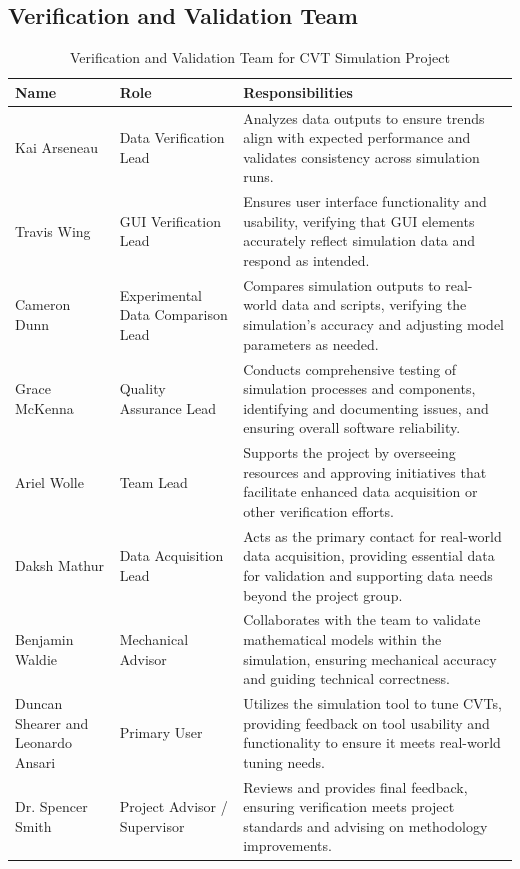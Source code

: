\documentclass[12pt, titlepage]{article}
\begin{document}
\subsection{Verification and Validation Team}

\begin{table}[h!]
  \centering
  \begin{tabular}{|p{3cm}|p{3cm}|p{10cm}|}
  \hline
  \textbf{Name} & \textbf{Role} & \textbf{Responsibilities} \\
  \hline
  Kai Arseneau & Data Verification Lead & Analyzes data outputs to ensure trends align with expected performance and validates consistency across simulation runs. \\
  \hline
  Travis Wing & GUI Verification Lead & Ensures user interface functionality and usability, verifying that GUI elements accurately reflect simulation data and respond as intended. \\
  \hline
  Cameron Dunn & Experimental Data Comparison Lead & Compares simulation outputs to real-world data and scripts, verifying the simulation's accuracy and adjusting model parameters as needed. \\
  \hline
  Grace McKenna & Quality Assurance Lead & Conducts comprehensive testing of simulation processes and components, identifying and documenting issues, and ensuring overall software reliability. \\
  \hline
  Ariel Wolle & Team Lead & Supports the project by overseeing resources and approving initiatives that facilitate enhanced data acquisition or other verification efforts. \\
  \hline
  Daksh Mathur &  Data Acquisition Lead & Acts as the primary contact for real-world data acquisition, providing essential data for validation and supporting data needs beyond the project group. \\
  \hline
  Benjamin Waldie & Mechanical Advisor & Collaborates with the team to validate mathematical models within the simulation, ensuring mechanical accuracy and guiding technical correctness. \\
  \hline
  Duncan Shearer and Leonardo Ansari & Primary User & Utilizes the simulation tool to tune CVTs, providing feedback on tool usability and functionality to ensure it meets real-world tuning needs. \\
  \hline
  Dr. Spencer Smith & Project Advisor / Supervisor & Reviews and provides final feedback, ensuring verification meets project standards and advising on methodology improvements. \\
  \hline
  \end{tabular}
  \caption{Verification and Validation Team for CVT Simulation Project}
  \label{tab:vnv_team}
\end{table}
\restoregeometry
    
\end{document}
